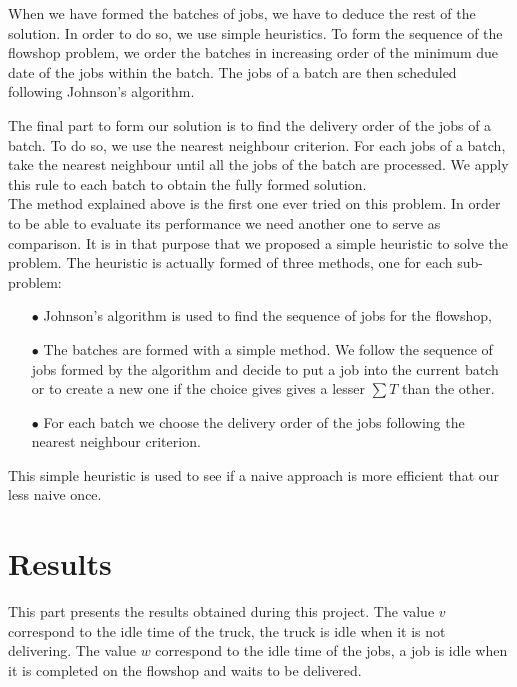 \documentclass[UTF8, twoside]{EPURapport}
\begin{document}
\clearpage

	When we have formed the batches of jobs, we have to deduce the rest of the solution. In order to do so, we use simple heuristics. To form the sequence of the flowshop problem, we order the batches in increasing order of the minimum due date of the jobs within the batch. The jobs of a batch are then scheduled following Johnson's algorithm.
	
	The final part to form our solution is to find the delivery order of the jobs of a batch. To do so, we use the nearest neighbour criterion. For each jobs of a batch, take the nearest neighbour until all the jobs of the batch are processed. We apply this rule to each batch to obtain the fully formed solution.
\\

	The method explained above is the first one ever tried on this problem. In order to be able to evaluate its performance we need another one to serve as comparison. It is in that purpose that we proposed a simple heuristic to solve the problem. The heuristic is actually formed of three methods, one for each sub-problem:
\begin{itemize}
\item[$\bullet$] Johnson's algorithm is used to find the sequence of jobs for the flowshop,
\item[$\bullet$] The batches are formed with a simple method. We follow the sequence of jobs formed by the algorithm and decide to put a job into the current batch or to create a new one if the choice gives gives a lesser $\sum T$ than the other.
\item[$\bullet$] For each batch we choose the delivery order of the jobs following the nearest neighbour criterion.
\end{itemize}

	This simple heuristic is used to see if a naive approach is more efficient that our less naive once.
	
\chapter{Results}

	\hspace{4ex}This part presents the results obtained during this project. The value $v$ correspond to the idle time of the truck, the truck is idle when it is not delivering. The value $w$ correspond to the idle time of the jobs, a job is idle when it is completed on the flowshop and waits to be delivered.
	
\end{document}
